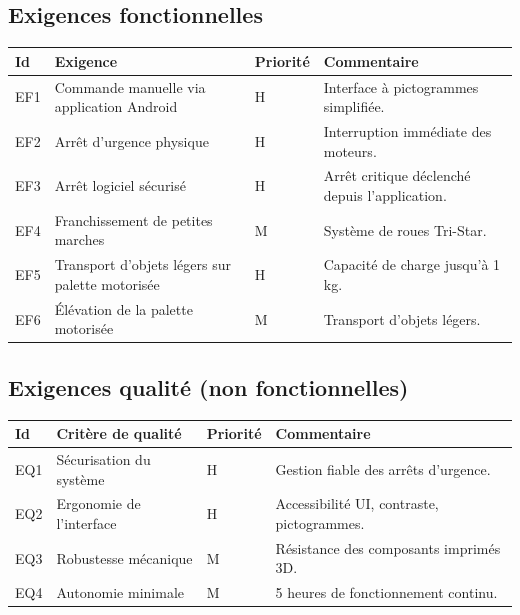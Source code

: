 \documentclass[12pt,a4paper]{article}
\begin{document}
\subsection{Exigences fonctionnelles}

\begin{tabular}{|p{1.3cm}|p{6.6cm}|p{1.7cm}|p{4.5cm}|}
\hline
\textbf{Id} & \textbf{Exigence} & \textbf{Priorité} & \textbf{Commentaire} \\ \hline


EF1 & Commande manuelle via application Android & H & Interface à pictogrammes simplifiée. \\ \hline

EF2 & Arrêt d’urgence physique & H & Interruption immédiate des moteurs. \\ \hline

EF3 & Arrêt logiciel sécurisé & H & Arrêt critique déclenché depuis l’application. \\ \hline

EF4 & Franchissement de petites marches & M & Système de roues Tri-Star. \\ \hline

EF5 & Transport d’objets légers sur palette motorisée & H & Capacité de charge jusqu’à 1 kg. \\ \hline

EF6 & Élévation de la palette motorisée & M & Transport d’objets légers. \\ \hline


\end{tabular}

\vspace{0.6cm}

\subsection{Exigences qualité (non fonctionnelles)}

\begin{tabular}{|p{1.3cm}|p{6.6cm}|p{1.7cm}|p{4.5cm}|}
\hline
\textbf{Id} & \textbf{Critère de qualité} & \textbf{Priorité} & \textbf{Commentaire} \\ \hline

EQ1 & Sécurisation du système & H & Gestion fiable des arrêts d’urgence. \\ \hline

EQ2 & Ergonomie de l’interface & H & Accessibilité UI, contraste, pictogrammes. \\ \hline

EQ3 & Robustesse mécanique & M & Résistance des composants imprimés 3D. \\ \hline

EQ4 & Autonomie minimale & M & 5 heures de fonctionnement continu. \\ \hline

\end{tabular}
\end{document}
